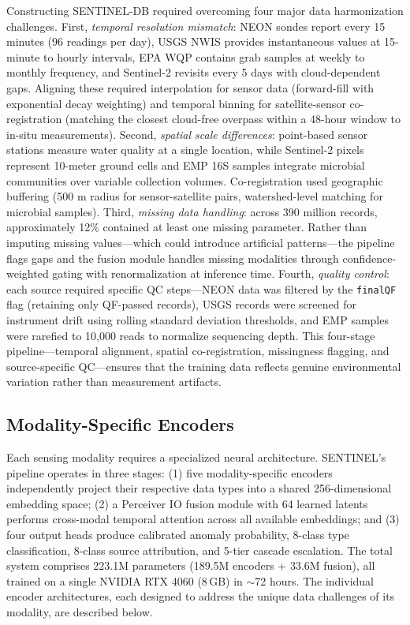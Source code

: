 \documentclass[12pt]{article}
\begin{document}
Constructing SENTINEL-DB required overcoming four major data harmonization challenges. First, \textit{temporal resolution mismatch}: NEON sondes report every 15 minutes (96 readings per day), USGS NWIS provides instantaneous values at 15-minute to hourly intervals, EPA WQP contains grab samples at weekly to monthly frequency, and Sentinel-2 revisits every 5 days with cloud-dependent gaps. Aligning these required interpolation for sensor data (forward-fill with exponential decay weighting) and temporal binning for satellite-sensor co-registration (matching the closest cloud-free overpass within a 48-hour window to in-situ measurements). Second, \textit{spatial scale differences}: point-based sensor stations measure water quality at a single location, while Sentinel-2 pixels represent 10-meter ground cells and EMP 16S samples integrate microbial communities over variable collection volumes. Co-registration used geographic buffering (500 m radius for sensor-satellite pairs, watershed-level matching for microbial samples). Third, \textit{missing data handling}: across 390 million records, approximately 12\% contained at least one missing parameter. Rather than imputing missing values---which could introduce artificial patterns---the pipeline flags gaps and the fusion module handles missing modalities through confidence-weighted gating with renormalization at inference time. Fourth, \textit{quality control}: each source required specific QC steps---NEON data was filtered by the \texttt{finalQF} flag (retaining only QF-passed records), USGS records were screened for instrument drift using rolling standard deviation thresholds, and EMP samples were rarefied to 10,000 reads to normalize sequencing depth. This four-stage pipeline---temporal alignment, spatial co-registration, missingness flagging, and source-specific QC---ensures that the training data reflects genuine environmental variation rather than measurement artifacts.

\subsection{Modality-Specific Encoders}

Each sensing modality requires a specialized neural architecture. SENTINEL's pipeline operates in three stages: (1) five modality-specific encoders independently project their respective data types into a shared 256-dimensional embedding space; (2) a Perceiver IO fusion module with 64 learned latents performs cross-modal temporal attention across all available embeddings; and (3) four output heads produce calibrated anomaly probability, 8-class type classification, 8-class source attribution, and 5-tier cascade escalation. The total system comprises 223.1M parameters (189.5M encoders + 33.6M fusion), all trained on a single NVIDIA RTX 4060 (8\,GB) in $\sim$72 hours. The individual encoder architectures, each designed to address the unique data challenges of its modality, are described below.
\end{document}
